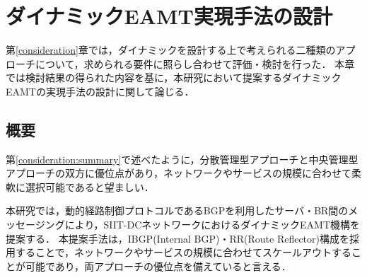 \chapter{ダイナミックEAMT実現手法の設計}
\label{proposal}
第\ref{consideration}章では，ダイナミックを設計する上で考えられる二種類のアプローチについて，求められる要件に照らし合わせて評価・検討を行った．
本章では検討結果の得られた内容を基に，本研究において提案するダイナミックEAMTの実現手法の設計に関して論じる．

\section{概要}
第\ref{consideration:summary}で述べたように，分散管理型アプローチと中央管理型アプローチの双方に優位点があり，ネットワークやサービスの規模に合わせて柔軟に選択可能であると望ましい．

本研究では，動的経路制御プロトコルであるBGPを利用したサーバ・BR間のメッセージングにより，SIIT-DCネットワークにおけるダイナミックEAMT機構を提案する．
本提案手法は，IBGP(Internal BGP)・RR(Route Reflector)構成を採用することで，ネットワークやサービスの規模に合わせてスケールアウトすることが可能であり，両アプローチの優位点を備えていると言える．







